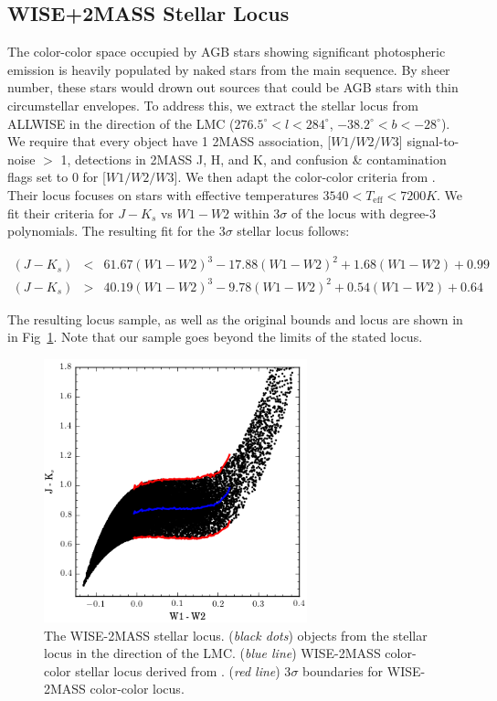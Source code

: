 \subsection{WISE+2MASS Stellar Locus}
The color-color space occupied by AGB stars showing significant photospheric emission is heavily populated by naked stars from the main sequence. By sheer number, these stars would drown out sources that could be AGB stars with thin circumstellar envelopes. To address this, we extract the stellar locus from ALLWISE in the direction of the LMC ($276.5^\circ < l < 284^\circ$, $-38.2^\circ < b < -28^\circ$). We require that every object have 1 2MASS association, [$W1/W2/W3$] signal-to-noise $>$ 1, detections in 2MASS J, H, and K,  and confusion \& contamination flags set to 0 for [$W1/W2/W3$]. We then adapt the color-color criteria from \cite{2014MNRAS.440.3430D}. Their locus focuses on stars with effective temperatures $3540 < T_\text{eff} < 7200 K$. We fit their criteria for $J-K_s$ vs $W1 - W2$ within 3$\sigma$ of the locus with degree-3 polynomials. The resulting fit for the 3$\sigma$ stellar locus follows:

\begin{eqnarray}
(J - K_s) & < & 61.67(W1-W2)^3 - 17.88(W1-W2)^2 + 1.68(W1-W2) + 0.99\\
(J - K_s) & > & 40.19(W1-W2)^3 - 9.78(W1-W2)^2 + 0.54(W1-W2) + 0.64
\end{eqnarray}

The resulting locus sample, as well as the original \cite{2014MNRAS.440.3430D} bounds and locus are shown in in Fig~\ref{fig:locus}. Note that our sample goes beyond the limits of the stated locus.

\begin{figure}[h]
\includegraphics[width=3in]{figs/lmc_locus_3sig.png}
\caption{The WISE-2MASS stellar locus. (\emph{black dots}) objects from the stellar locus in the direction of the LMC. (\emph{blue line}) WISE-2MASS color-color stellar locus derived from \cite{2014MNRAS.440.3430D}. (\emph{red line}) 3$\sigma$ boundaries for WISE-2MASS color-color locus. \label{fig:locus}}
\end{figure}


